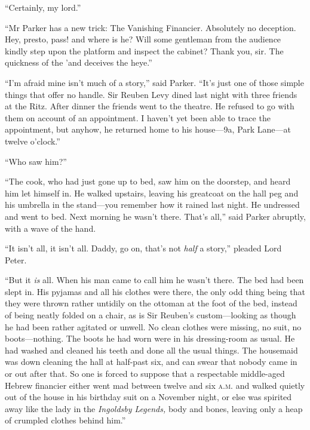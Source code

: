 \enquote{Certainly, my lord.}

\enquote{Mr Parker has a new trick: The Vanishing Financier. Absolutely no deception. Hey, presto, pass! and where is he? Will some gentleman from the audience kindly step upon the platform and inspect the cabinet? Thank you, sir. The quickness of the ’and deceives the heye.}

\enquote{I’m afraid mine isn’t much of a story,} said Parker. \enquote{It’s just one of those simple things that offer no handle. Sir Reuben Levy dined last night with three friends at the Ritz. After dinner the friends went to the theatre. He refused to go with them on account of an appointment. I haven’t yet been able to trace the appointment, but anyhow, he returned home to his house\allowbreak---\allowbreak 9a, Park Lane\allowbreak---\allowbreak at twelve o’clock.}

\enquote{Who saw him?}

\enquote{The cook, who had just gone up to bed, saw him on the doorstep, and heard him let himself in. He walked upstairs, leaving his greatcoat on the hall peg and his umbrella in the stand\allowbreak---\allowbreak you remember how it rained last night. He undressed and went to bed. Next morning he wasn’t there. That’s all,} said Parker abruptly, with a wave of the hand.

\enquote{It isn’t all, it isn’t all. Daddy, go on, that’s not \textit{half} a story,} pleaded Lord Peter.

\enquote{But it \textit{is} all. When his man came to call him he wasn’t there. The bed had been slept in. His pyjamas and all his clothes were there, the only odd thing being that they were thrown rather untidily on the ottoman at the foot of the bed, instead of being neatly folded on a chair, as is Sir Reuben’s custom\allowbreak---\allowbreak looking as though he had been rather agitated or unwell. No clean clothes were missing, no suit, no boots\allowbreak---\allowbreak nothing. The boots he had worn were in his dressing-room as usual. He had washed and cleaned his teeth and done all the usual things. The housemaid was down cleaning the hall at half-past six, and can swear that nobody came in or out after that. So one is forced to suppose that a respectable middle-aged Hebrew financier either went mad between twelve and six \textsc{a.m.} and walked quietly out of the house in his birthday suit on a November night, or else was spirited away like the lady in the \textit{Ingoldsby Legends,} body and bones, leaving only a heap of crumpled clothes behind him.}

